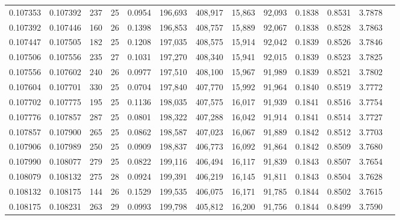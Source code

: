 \begin{tabular}{rrrrrrrrrrrrr}
0.107353 & 0.107392 & 237 &  25 &                                     0.0954 & 196,693 & 408,917 &  15,863 &  92,093 & 0.1838 & 0.8531 & 3.7878 \\
0.107392 & 0.107446 & 160 &  26 &                                     0.1398 & 196,853 & 408,757 &  15,889 &  92,067 & 0.1838 & 0.8528 & 3.7863 \\
0.107447 & 0.107505 & 182 &  25 &                                     0.1208 & 197,035 & 408,575 &  15,914 &  92,042 & 0.1839 & 0.8526 & 3.7846 \\
0.107506 & 0.107556 & 235 &  27 &                                     0.1031 & 197,270 & 408,340 &  15,941 &  92,015 & 0.1839 & 0.8523 & 3.7825 \\
0.107556 & 0.107602 & 240 &  26 &                                     0.0977 & 197,510 & 408,100 &  15,967 &  91,989 & 0.1839 & 0.8521 & 3.7802 \\
0.107604 & 0.107701 & 330 &  25 &                                     0.0704 & 197,840 & 407,770 &  15,992 &  91,964 & 0.1840 & 0.8519 & 3.7772 \\
0.107702 & 0.107775 & 195 &  25 &                                     0.1136 & 198,035 & 407,575 &  16,017 &  91,939 & 0.1841 & 0.8516 & 3.7754 \\
0.107776 & 0.107857 & 287 &  25 &                                     0.0801 & 198,322 & 407,288 &  16,042 &  91,914 & 0.1841 & 0.8514 & 3.7727 \\
0.107857 & 0.107900 & 265 &  25 &                                     0.0862 & 198,587 & 407,023 &  16,067 &  91,889 & 0.1842 & 0.8512 & 3.7703 \\
0.107906 & 0.107989 & 250 &  25 &                                     0.0909 & 198,837 & 406,773 &  16,092 &  91,864 & 0.1842 & 0.8509 & 3.7680 \\
0.107990 & 0.108077 & 279 &  25 &                                     0.0822 & 199,116 & 406,494 &  16,117 &  91,839 & 0.1843 & 0.8507 & 3.7654 \\
0.108079 & 0.108132 & 275 &  28 &                                     0.0924 & 199,391 & 406,219 &  16,145 &  91,811 & 0.1843 & 0.8504 & 3.7628 \\
0.108132 & 0.108175 & 144 &  26 &                                     0.1529 & 199,535 & 406,075 &  16,171 &  91,785 & 0.1844 & 0.8502 & 3.7615 \\
0.108175 & 0.108231 & 263 &  29 &                                     0.0993 & 199,798 & 405,812 &  16,200 &  91,756 & 0.1844 & 0.8499 & 3.7590 \\

\end{tabular}
